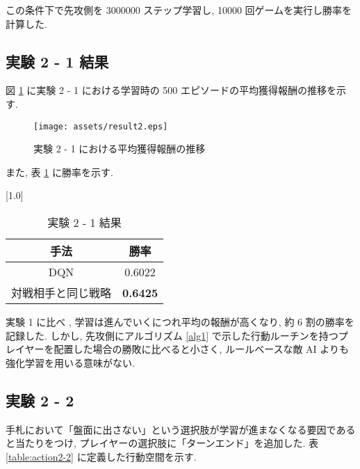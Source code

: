 \documentclass{jarticle}     %
\begin{document}
この条件下で先攻側を 3000000 ステップ学習し, 10000 回ゲームを実行し勝率を計算した.

\subsection{実験 2 - 1 結果}
図 \ref{fig:result2-1} に実験 2 - 1 における学習時の 500 エピソードの平均獲得報酬の推移を示す.
  \begin{figure}[h]
    \centering
    \texttt{[image: assets/result2.eps]}
    \caption{実験 2 - 1 における平均獲得報酬の推移}
    \label{fig:result2-1}
  \end{figure}

また, 表 \ref{table:result2-1} に勝率を示す.

\begin{table}[t]
  \centering
  \caption{実験 2 - 1 結果}
  \vspace{-0.3cm}
  \label{table:result2-1}
  \scalebox{1.0}[1.0]{
    \begin{tabular}{|c|c|}
      \hline
      手法 & 勝率 \\ \hline
      DQN & 0.6022 \\ \hline
      対戦相手と同じ戦略 & \textbf{0.6425} \\ \hline

      \end{tabular}
  }
  \end{table}

実験 1 に比べ , 学習は進んでいくにつれ平均の報酬が高くなり, 約 6 割の勝率を記録した.
しかし, 先攻側にアルゴリズム \ref{alg1} で示した行動ルーチンを持つプレイヤーを配置した場合の勝敗に比べると小さく, ルールベースな敵 AI よりも強化学習を用いる意味がない.

\subsection{実験 2 - 2 }
手札において「盤面に出さない」という選択肢が学習が進まなくなる要因であると当たりをつけ, プレイヤーの選択肢に「ターンエンド」を追加した. 表 \ref{table:action2-2} に定義した行動空間を示す.
\end{document}
